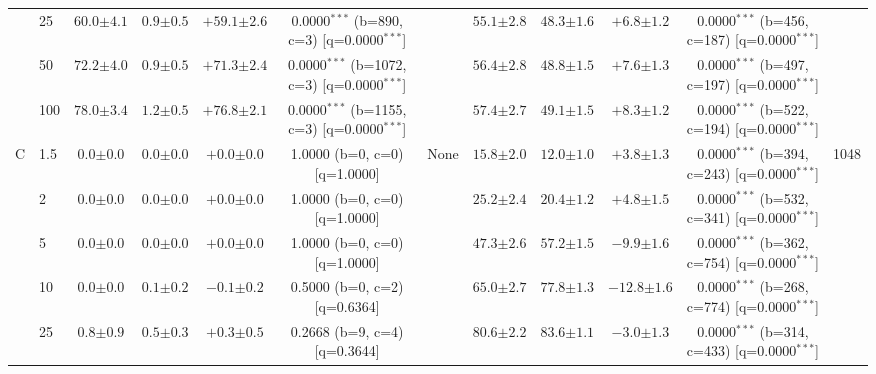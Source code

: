 \begin{table}[h!]
\begin{tabular}{l l | cccc c | cccc c}
 & 25 & $60.0 {\scriptstyle \pm 4.1}$ & $0.9 {\scriptstyle \pm 0.5}$ & $+59.1 {\scriptstyle \pm 2.6}$ & 0.0000$^{***}$ (b=890, c=3) [q=0.0000$^{***}$] &  & $55.1 {\scriptstyle \pm 2.8}$ & $48.3 {\scriptstyle \pm 1.6}$ & $+6.8 {\scriptstyle \pm 1.2}$ & 0.0000$^{***}$ (b=456, c=187) [q=0.0000$^{***}$] &  \\
 & 50 & $72.2 {\scriptstyle \pm 4.0}$ & $0.9 {\scriptstyle \pm 0.5}$ & $+71.3 {\scriptstyle \pm 2.4}$ & 0.0000$^{***}$ (b=1072, c=3) [q=0.0000$^{***}$] &  & $56.4 {\scriptstyle \pm 2.8}$ & $48.8 {\scriptstyle \pm 1.5}$ & $+7.6 {\scriptstyle \pm 1.3}$ & 0.0000$^{***}$ (b=497, c=197) [q=0.0000$^{***}$] &  \\
 & 100 & $78.0 {\scriptstyle \pm 3.4}$ & $1.2 {\scriptstyle \pm 0.5}$ & $+76.8 {\scriptstyle \pm 2.1}$ & 0.0000$^{***}$ (b=1155, c=3) [q=0.0000$^{***}$] &  & $57.4 {\scriptstyle \pm 2.7}$ & $49.1 {\scriptstyle \pm 1.5}$ & $+8.3 {\scriptstyle \pm 1.2}$ & 0.0000$^{***}$ (b=522, c=194) [q=0.0000$^{***}$] &  \\
\midrule
C & 1.5 & $0.0 {\scriptstyle \pm 0.0}$ & $0.0 {\scriptstyle \pm 0.0}$ & $+0.0 {\scriptstyle \pm 0.0}$ & 1.0000 (b=0, c=0) [q=1.0000] & None & $15.8 {\scriptstyle \pm 2.0}$ & $12.0 {\scriptstyle \pm 1.0}$ & $+3.8 {\scriptstyle \pm 1.3}$ & 0.0000$^{***}$ (b=394, c=243) [q=0.0000$^{***}$] & 1048 \\
 & 2 & $0.0 {\scriptstyle \pm 0.0}$ & $0.0 {\scriptstyle \pm 0.0}$ & $+0.0 {\scriptstyle \pm 0.0}$ & 1.0000 (b=0, c=0) [q=1.0000] &  & $25.2 {\scriptstyle \pm 2.4}$ & $20.4 {\scriptstyle \pm 1.2}$ & $+4.8 {\scriptstyle \pm 1.5}$ & 0.0000$^{***}$ (b=532, c=341) [q=0.0000$^{***}$] &  \\
 & 5 & $0.0 {\scriptstyle \pm 0.0}$ & $0.0 {\scriptstyle \pm 0.0}$ & $+0.0 {\scriptstyle \pm 0.0}$ & 1.0000 (b=0, c=0) [q=1.0000] &  & $47.3 {\scriptstyle \pm 2.6}$ & $57.2 {\scriptstyle \pm 1.5}$ & $-9.9 {\scriptstyle \pm 1.6}$ & 0.0000$^{***}$ (b=362, c=754) [q=0.0000$^{***}$] &  \\
 & 10 & $0.0 {\scriptstyle \pm 0.0}$ & $0.1 {\scriptstyle \pm 0.2}$ & $-0.1 {\scriptstyle \pm 0.2}$ & 0.5000 (b=0, c=2) [q=0.6364] &  & $65.0 {\scriptstyle \pm 2.7}$ & $77.8 {\scriptstyle \pm 1.3}$ & $-12.8 {\scriptstyle \pm 1.6}$ & 0.0000$^{***}$ (b=268, c=774) [q=0.0000$^{***}$] &  \\
 & 25 & $0.8 {\scriptstyle \pm 0.9}$ & $0.5 {\scriptstyle \pm 0.3}$ & $+0.3 {\scriptstyle \pm 0.5}$ & 0.2668 (b=9, c=4) [q=0.3644] &  & $80.6 {\scriptstyle \pm 2.2}$ & $83.6 {\scriptstyle \pm 1.1}$ & $-3.0 {\scriptstyle \pm 1.3}$ & 0.0000$^{***}$ (b=314, c=433) [q=0.0000$^{***}$] &  \\

\end{tabular}
\end{table}
